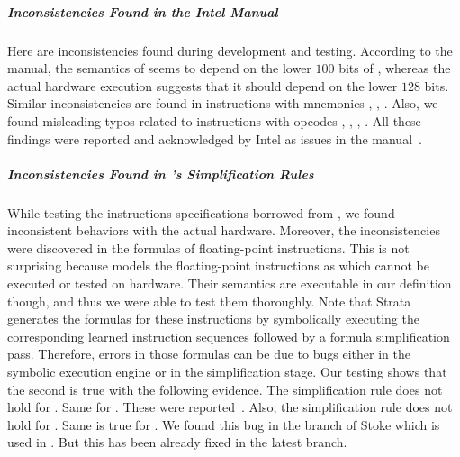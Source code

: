 \subparagraph{Inconsistencies Found in the Intel Manual} Here are inconsistencies found during development and testing.  
According to the manual, the semantics of     seems to depend on the lower $100$ bits of , whereas the actual hardware execution suggests that it should depend on the lower $128$ bits. Similar inconsistencies are found in instructions with mnemonics , , .
Also, we found misleading typos related to instructions with opcodes , , , .    
All these findings were reported and acknowledged by Intel as issues in the manual~\cite{BugIntel}.
 
\subparagraph{Inconsistencies Found in \Strata's Simplification Rules}
While testing the instructions specifications borrowed from \Strata, we found inconsistent behaviors with the actual hardware. Moreover, the inconsistencies were discovered in the formulas of floating-point instructions. This is not surprising because \Strata models the floating-point instructions as \uif{} which cannot be executed or tested on hardware. Their semantics are executable in our definition though, and thus we were able to test them thoroughly. Note that Strata generates the formulas for these instructions by symbolically  executing  the corresponding learned  instruction sequences followed by a formula simplification pass. Therefore, errors in those formulas can be due to bugs either in the symbolic execution engine or in the simplification stage. Our testing shows that the second is true with the following evidence.
The simplification rule  does not hold for . Same for . These were reported~\cite{PC1}.
Also, the simplification rule  does not hold for .  Same is true for . We found this bug in the  branch of Stoke which is used in \Strata. But this has been already fixed in the latest \Stoke branch.

